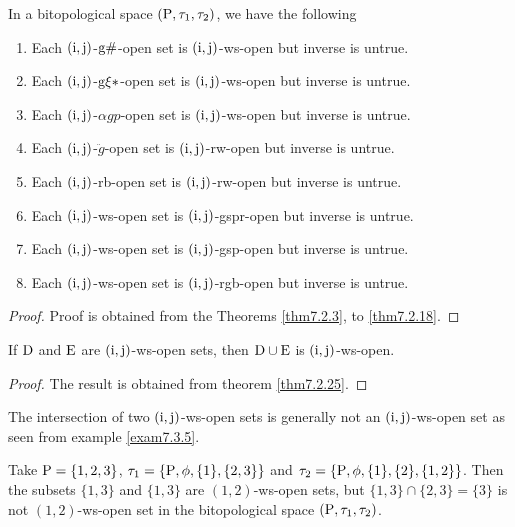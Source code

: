 \begin{thm}\label{thm7.3.2}
In a bitopological space $(\mathrm{P}, \tau_1, \tau_2 )$, we have the following
\begin{enumerate}[(1)]
\item Each $(\mathrm{i}, \mathrm{j})$-$\mathrm{g}\#$-open set is $(\mathrm{i}, \mathrm{j})$-ws-open but inverse is untrue.
\item Each $(\mathrm{i}, \mathrm{j})$-$\mathrm{g}\xi*$-open set is $(\mathrm{i}, \mathrm{j})$-ws-open but inverse is untrue.
\item Each $(\mathrm{i}, \mathrm{j})$-$\alpha gp$-open set is $(\mathrm{i}, \mathrm{j})$-ws-open but inverse is untrue.
\item Each $(\mathrm{i}, \mathrm{j})$-$\ddot{g}$-open set is $(\mathrm{i}, \mathrm{j})$-rw-open but inverse is untrue.
\item Each $(\mathrm{i}, \mathrm{j})$-rb-open set is $(\mathrm{i}, \mathrm{j})$-rw-open but inverse is untrue.
\item Each $(\mathrm{i}, \mathrm{j})$-ws-open set is $(\mathrm{i}, \mathrm{j})$-gspr-open but inverse is untrue.
\item Each $(\mathrm{i}, \mathrm{j})$-ws-open set is $(\mathrm{i}, \mathrm{j})$-gsp-open but inverse is untrue.
\item Each $(\mathrm{i}, \mathrm{j})$-ws-open set is $(\mathrm{i}, \mathrm{j})$-rgb-open but inverse is untrue.
\end{enumerate}
\end{thm}

\begin{proof}
Proof is obtained from the Theorems \ref{thm7.2.3}, to \ref{thm7.2.18}.
\end{proof}

\begin{thm}\label{thm7.3.3}
If $\mathrm{D}$ and $\mathrm{E}$ are $(\mathrm{i}, \mathrm{j})$-ws-open sets, then $\mathrm{D}\cup \mathrm{E}$ is $(\mathrm{i}, \mathrm{j})$-ws-open.
\end{thm}

\begin{proof}
The result is obtained from theorem \ref{thm7.2.25}.
\end{proof}

\begin{rem}\label{rem7.3.4}
The intersection of two $(\mathrm{i}, \mathrm{j})$-ws-open sets is generally not an $(\mathrm{i}, \mathrm{j})$-ws-open set as seen from example \ref{exam7.3.5}.
\end{rem}

\begin{exm}\label{exam7.3.5}
Take $\mathrm{P}=\{ 1, 2, 3\}$, $\tau_1 =\{\mathrm{P}, \phi, \{1\}, \{2,3\}\}$ and $\tau_2 =\{\TSP, \phi, \{1\}, \{2\},\break \{1, 2\}\}$. Then the subsets $\{1, 3\}$ and $\{1, 3\}$ are $(1, 2)$-ws-open sets, but $\{1, 3\}\cap \{2,3\}=\{3\}$ is not $(1, 2)$-ws-open set in the bitopological space $(\mathrm{P}, \tau_1, \tau_2 )$.
\end{exm}

